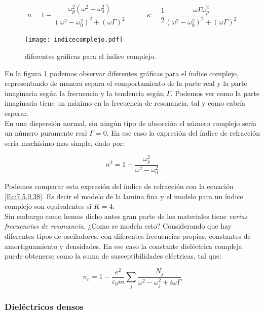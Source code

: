 \documentclass[12pt,a4paper]{article}
\newcommand{\tquad}{\quad \quad \quad}
\numberwithin{equation}{section}
\numberwithin{figure}{section}
\begin{document}
\begin{equation}
n = 1 - \dfrac{\omega_p^2 (\omega^2-\omega_0^2)}{(\omega^2-\omega_0^2)^2 + (\omega \Gamma)^2} \tquad \kappa = \dfrac{1}{2} \dfrac{\omega \Gamma \omega_p^2}{(\omega^2 - \omega_0^2)^2 + (\omega \Gamma)^2}
\end{equation}



\begin{figure}[h!] \centering
\texttt{[image: indicecomplejo.pdf]}
\caption{diferentes gráficas para el índice complejo.}
\label{Fig:8.1.01}
\end{figure}


En la figura \ref{Fig:8.1.01} podemos observar diferentes gráficas para el índice complejo, representando de manera separa el comportamiento de la parte real y la parte imaginaria según la frecuencia y la tendencia según $\Gamma$. Podemos ver como la parte imaginaria tiene un máximo en la frecuencia de resonancia, tal y como cabría esperar. \\

En una dispersión normal, sin ningún tipo de absorción el número complejo sería un número puramente real $\Gamma=0$. En ese caso la expresión del índice de refracción sería muchísimo mas simple, dado por:

\begin{equation}
n^2 = 1 -  \dfrac{\omega_p^2}{\omega^2-\omega^2_0}
\end{equation}

Podemos comparar esta expresión del índice de refracción con la ecuación \ref{Ec:7.5.0.38}. Es decir el modelo de la lamina fina y el modelo para un índice complejo son equivalentes si $K=4$. \\

Sin embargo como hemos dicho antes gran parte de los materiales tiene \textit{varias frecuencias de resonancia}. ¿Como se modela esto? Considerando que hay diferentes tipos de osciladores, con diferentes frecuencias propias, constantes de amortiguamiento y densidades. En ese caso la constante  dieléctrica compleja puede obtenerse como la suma de susceptibilidades eléctricas, tal que:

\begin{equation}
n_c = 1 - \dfrac{e^2}{\varepsilon_0 m} \sum_j \dfrac{N_j}{\omega^2 - \omega^2_j + i \omega \Gamma}
\end{equation}

\subsubsection{Dieléctricos densos}
\end{document}
